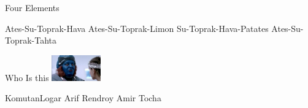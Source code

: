 \documentclass{exam}
\begin{document}
\begin{questions}
\question Four Elements\newline
\begin{oneparchoices}
\choice Ates-Su-Toprak-Hava
\choice Ates-Su-Toprak-Limon
\choice Su-Toprak-Hava-Patates
\choice Ates-Su-Toprak-Tahta
\end{oneparchoices}
\question Who Is this\newline
\includegraphics[height=3em]{rendroy2.jpg} \newline
\begin{oneparchoices}
\choice KomutanLogar
\choice Arif
\choice Rendroy
\choice Amir Tocha
\end{oneparchoices}
\end{questions}
\end{document}
